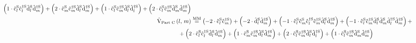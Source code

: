 \begin{equation}
\begin{split}
            \left(1 \cdot \cop[\schroedingerPicture]{l}{}\cop[\schroedingerPicture]{l}{\dagger}\dop[\schroedingerPicture]{l}{}\dop[\schroedingerPicture]{m}{\dagger}\right)
            +
            \left(2 \cdot \cop[\schroedingerPicture]{m}{}\cop[\schroedingerPicture]{m}{\dagger}\dop[\schroedingerPicture]{l}{}\dop[\schroedingerPicture]{m}{\dagger}\right)
            +
            \left(1 \cdot \cop[\schroedingerPicture]{l}{}\cop[\schroedingerPicture]{m}{\dagger}\dop[\schroedingerPicture]{l}{}\dop[\schroedingerPicture]{l}{\dagger}\right)
            +
            \left(2 \cdot \cop[\schroedingerPicture]{l}{}\cop[\schroedingerPicture]{m}{\dagger}\dop[\schroedingerPicture]{m}{}\dop[\schroedingerPicture]{m}{\dagger}\right)
        \\
        \VhamiltonianPartC{l}{m} &\stackrel{\text{MM}}{=} 
            \left(-2 \cdot \cop[\schroedingerPicture]{l}{}\cop[\schroedingerPicture]{m}{\dagger}\right)
            +
            \left(-2 \cdot \dop[\schroedingerPicture]{l}{}\dop[\schroedingerPicture]{m}{\dagger}\right)
            +
            \left(-1 \cdot \cop[\schroedingerPicture]{l}{}\cop[\schroedingerPicture]{m}{}\cop[\schroedingerPicture]{l}{\dagger}\cop[\schroedingerPicture]{m}{\dagger}\dop[\schroedingerPicture]{l}{}\dop[\schroedingerPicture]{m}{\dagger}\right)
            +
            \left(-1 \cdot \cop[\schroedingerPicture]{l}{}\cop[\schroedingerPicture]{m}{\dagger}\dop[\schroedingerPicture]{l}{}\dop[\schroedingerPicture]{m}{}\dop[\schroedingerPicture]{l}{\dagger}\dop[\schroedingerPicture]{m}{\dagger}\right)
            +\\&\mkern-40mu+
            \left(2 \cdot \cop[\schroedingerPicture]{l}{}\cop[\schroedingerPicture]{l}{\dagger}\dop[\schroedingerPicture]{l}{}\dop[\schroedingerPicture]{m}{\dagger}\right)
            +
            \left(1 \cdot \cop[\schroedingerPicture]{m}{}\cop[\schroedingerPicture]{m}{\dagger}\dop[\schroedingerPicture]{l}{}\dop[\schroedingerPicture]{m}{\dagger}\right)
            +
            \left(2 \cdot \cop[\schroedingerPicture]{l}{}\cop[\schroedingerPicture]{m}{\dagger}\dop[\schroedingerPicture]{l}{}\dop[\schroedingerPicture]{l}{\dagger}\right)
            +
            \left(1 \cdot \cop[\schroedingerPicture]{l}{}\cop[\schroedingerPicture]{m}{\dagger}\dop[\schroedingerPicture]{m}{}\dop[\schroedingerPicture]{m}{\dagger}\right)
        \\
    \end{split}
\end{equation}